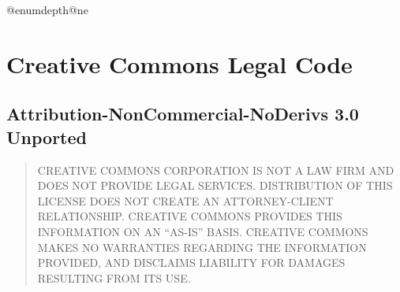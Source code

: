 \advance\csname @enumdepth\endcsname\csname @ne\endcsname
\section{Creative Commons Legal Code}

\subsection{Attribution-NonCommercial-NoDerivs 3.0 Unported}





\begin{quotation}
CREATIVE COMMONS CORPORATION IS NOT A LAW FIRM AND DOES
NOT PROVIDE LEGAL SERVICES. DISTRIBUTION OF THIS LICENSE
DOES NOT CREATE AN ATTORNEY-CLIENT RELATIONSHIP. CREATIVE
COMMONS PROVIDES THIS INFORMATION ON AN ``AS-IS'' BASIS.
CREATIVE COMMONS MAKES NO WARRANTIES REGARDING THE
INFORMATION PROVIDED, AND DISCLAIMS LIABILITY FOR DAMAGES
RESULTING FROM ITS USE.
\end{quotation}
